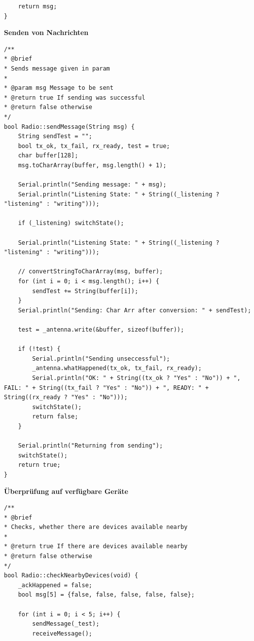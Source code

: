 \documentclass[a4paper, 11pt]{scrartcl}
\begin{document}
\begin{small}
\begin{lstlisting}
    return msg;
}
\end{lstlisting}

\begin{flushleft}\textbf{Senden von Nachrichten}\label{code:sending}\end{flushleft}
\begin{lstlisting}
/**
* @brief 
* Sends message given in param
* 
* @param msg Message to be sent
* @return true If sending was successful
* @return false otherwise
*/
bool Radio::sendMessage(String msg) {
    String sendTest = "";
    bool tx_ok, tx_fail, rx_ready, test = true;
    char buffer[128];
    msg.toCharArray(buffer, msg.length() + 1);
    
    Serial.println("Sending message: " + msg);
    Serial.println("Listening State: " + String((_listening ? "listening" : "writing")));

    if (_listening) switchState();
    
    Serial.println("Listening State: " + String((_listening ? "listening" : "writing")));

    // convertStringToCharArray(msg, buffer);
    for (int i = 0; i < msg.length(); i++) {
        sendTest += String(buffer[i]);
    }
    Serial.println("Sending: Char Arr after conversion: " + sendTest);
    
    test = _antenna.write(&buffer, sizeof(buffer));

    if (!test) {
        Serial.println("Sending unseccessful");
        _antenna.whatHappened(tx_ok, tx_fail, rx_ready);
        Serial.println("OK: " + String((tx_ok ? "Yes" : "No")) + ", FAIL: " + String((tx_fail ? "Yes" : "No")) + ", READY: " + String((rx_ready ? "Yes" : "No")));
        switchState();
        return false;
    }

    Serial.println("Returning from sending");
    switchState();
    return true;
}
\end{lstlisting}

\begin{flushleft}\textbf{Überprüfung auf verfügbare Geräte}\label{code:available}\end{flushleft}
\begin{lstlisting}
/**
* @brief 
* Checks, whether there are devices available nearby
* 
* @return true If there are devices available nearby 
* @return false otherwise
*/
bool Radio::checkNearbyDevices(void) {
    _ackHappened = false;
    bool msg[5] = {false, false, false, false, false};

    for (int i = 0; i < 5; i++) {
        sendMessage(_test);
        receiveMessage();


\end{lstlisting}
\end{small}
\end{document}
